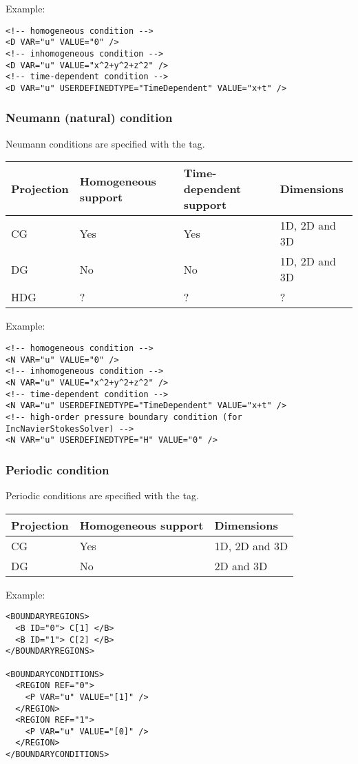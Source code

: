 Example:
\begin{lstlisting}[style=XMLStyle]
<!-- homogeneous condition -->
<D VAR="u" VALUE="0" />
<!-- inhomogeneous condition -->
<D VAR="u" VALUE="x^2+y^2+z^2" />
<!-- time-dependent condition -->
<D VAR="u" USERDEFINEDTYPE="TimeDependent" VALUE="x+t" />
\end{lstlisting}

\subsubsection{Neumann (natural) condition}
Neumann conditions are specified with the  tag.

\begin{tabular}{llll}
Projection & Homogeneous support & Time-dependent support & Dimensions \\
\toprule
CG & Yes & Yes & 1D, 2D and 3D \\
DG & No  & No  & 1D, 2D and 3D \\
HDG & ? & ? & ?
\end{tabular}

Example:
\begin{lstlisting}[style=XMLStyle]
<!-- homogeneous condition -->
<N VAR="u" VALUE="0" />
<!-- inhomogeneous condition -->
<N VAR="u" VALUE="x^2+y^2+z^2" />
<!-- time-dependent condition -->
<N VAR="u" USERDEFINEDTYPE="TimeDependent" VALUE="x+t" />
<!-- high-order pressure boundary condition (for IncNavierStokesSolver) -->
<N VAR="u" USERDEFINEDTYPE="H" VALUE="0" />
\end{lstlisting}

\subsubsection{Periodic condition}
Periodic conditions are specified with the  tag.

\begin{tabular}{lll}
Projection & Homogeneous support & Dimensions \\
\toprule
CG  & Yes & 1D, 2D and 3D \\
DG  & No  & 2D and 3D
\end{tabular}

Example:
\begin{lstlisting}[style=XMLStyle]
<BOUNDARYREGIONS>
  <B ID="0"> C[1] </B>
  <B ID="1"> C[2] </B>
</BOUNDARYREGIONS>

<BOUNDARYCONDITIONS>
  <REGION REF="0">
    <P VAR="u" VALUE="[1]" />
  </REGION>
  <REGION REF="1">
    <P VAR="u" VALUE="[0]" />
  </REGION>
</BOUNDARYCONDITIONS>
\end{lstlisting}

